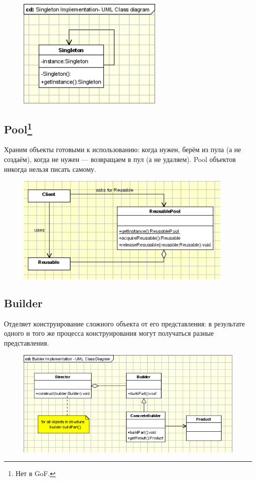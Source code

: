 \documentclass[11pt,a4paper]{article}
\begin{document}
\begin{figure}[H]
	\centering
	\includegraphics[width=200pt]{pics/singleton-pattern.png}
\end{figure}

\subsection{Pool\footnote{Нет в GoF.}}
Храним объекты готовыми к использованию: когда нужен, берём из пула (а не создаём), когда не нужен — возвращаем в пул (а не удаляем). Pool объектов никогда нельзя писать самому.

\begin{figure}[H]
	\centering
	\includegraphics[width=300pt]{pics/objectpool-pattern.png}
\end{figure}

\subsection{Builder}
Отделяет конструирование сложного объекта от его представления: в результате одного и того же процесса конструирования могут получаться разные представления.

\begin{figure}[H]
	\centering
	\includegraphics[width=350pt]{pics/builder-pattern.png}
\end{figure}
\end{document}
